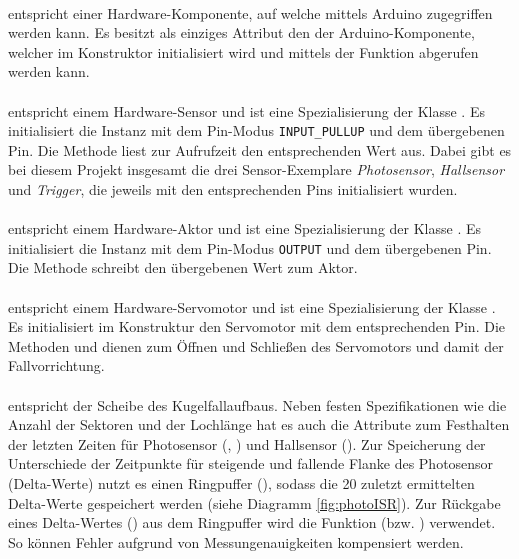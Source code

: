 \paragraph{} entspricht einer Hardware-Komponente, auf welche mittels Arduino zugegriffen werden kann.
Es besitzt als einziges Attribut den  der Arduino-Komponente, welcher im Konstruktor initialisiert wird und mittels der Funktion  abgerufen werden kann.

\paragraph{} entspricht einem Hardware-Sensor und ist eine Spezialisierung der Klasse . 
Es initialisiert die Instanz mit dem Pin-Modus \texttt{INPUT\_PULLUP} und dem übergebenen Pin.
Die Methode  liest zur Aufrufzeit den entsprechenden Wert aus.
Dabei gibt es bei diesem Projekt insgesamt die drei Sensor-Exemplare \textit{Photosensor}, \textit{Hallsensor} und \textit{Trigger}, die jeweils mit den entsprechenden Pins initialisiert wurden. 

\paragraph{} entspricht einem Hardware-Aktor und ist eine Spezialisierung der Klasse .
Es initialisiert die Instanz mit dem Pin-Modus \texttt{OUTPUT} und dem übergebenen Pin.
Die Methode  schreibt den übergebenen Wert zum Aktor.

\paragraph{} entspricht einem Hardware-Servomotor und ist eine Spezialisierung der Klasse .
Es initialisiert im Konstruktur den Servomotor mit dem entsprechenden Pin.
Die Methoden  und  dienen zum Öffnen und Schließen des Servomotors und damit der Fallvorrichtung.

\paragraph{} entspricht der Scheibe des Kugelfallaufbaus.
Neben festen Spezifikationen wie die Anzahl der Sektoren und der Lochlänge hat es auch die Attribute zum Festhalten der letzten Zeiten für Photosensor  (, ) und Hallsensor (). 
Zur Speicherung der Unterschiede der Zeitpunkte für steigende und fallende Flanke des Photosensor (Delta-Werte) nutzt es einen Ringpuffer (), sodass die 20 zuletzt ermittelten Delta-Werte gespeichert werden (siehe Diagramm \ref{fig:photoISR}).
Zur Rückgabe eines Delta-Wertes () aus dem Ringpuffer wird die Funktion  (bzw. ) verwendet.
So können Fehler aufgrund von Messungenauigkeiten kompensiert werden.

